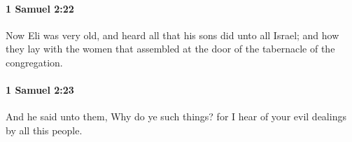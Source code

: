 		\paragraph{1 Samuel 2:22} %
			\label{1SAMUEL-2-22}

			Now Eli was very old, and heard all that his sons did unto all Israel; and how they lay with the women that assembled at the door of the tabernacle of the congregation.


		\paragraph{1 Samuel 2:23} %
			\label{1SAMUEL-2-23}

			And he said unto them, Why do ye such things? for I hear of your evil dealings by all this people.


